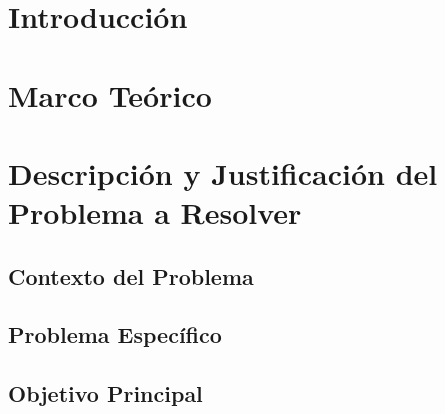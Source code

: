\documentclass{article}
\begin{document}
\tableofcontents %

\newpage %



\section{Introducción}\label{sec:intr}



\section{Marco Teórico}\label{sec:marc}



\section{Descripción y Justificación del Problema a Resolver}\label{sec:descr}

\subsection{Contexto del Problema}


\subsection{Problema Específico}

\subsection{Objetivo Principal}
\end{document}
